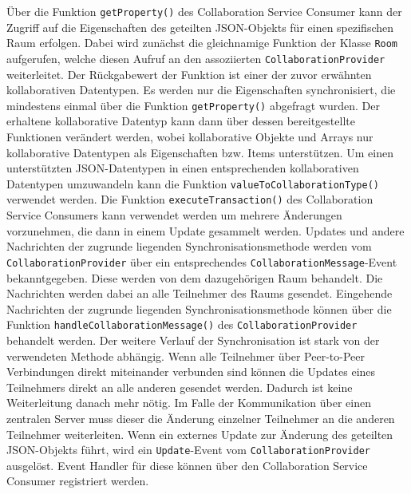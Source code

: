 Über die Funktion \texttt{getProperty()} des Collaboration Service Consumer kann der Zugriff auf die Eigenschaften des geteilten JSON-Objekts für einen spezifischen Raum erfolgen. Dabei wird zunächst die gleichnamige Funktion der Klasse \texttt{Room} aufgerufen, welche diesen Aufruf an den assoziierten \texttt{CollaborationProvider} weiterleitet. Der Rückgabewert der Funktion ist einer der zuvor erwähnten kollaborativen Datentypen. Es werden nur die Eigenschaften synchronisiert, die mindestens einmal über die Funktion \texttt{getProperty()} abgefragt wurden. Der erhaltene kollaborative Datentyp kann dann über dessen bereitgestellte Funktionen verändert werden, wobei kollaborative Objekte und Arrays nur kollaborative Datentypen als Eigenschaften bzw. Items unterstützen. Um einen unterstützten JSON-Datentypen in einen entsprechenden kollaborativen Datentypen umzuwandeln kann die Funktion \texttt{valueToCollaborationType()} verwendet werden. Die Funktion \texttt{executeTransaction()} des Collaboration Service Consumers kann verwendet werden um mehrere Änderungen vorzunehmen, die dann in einem Update gesammelt werden. Updates und andere Nachrichten der zugrunde liegenden Synchronisationsmethode werden vom \texttt{CollaborationProvider} über ein entsprechendes \texttt{CollaborationMessage}-Event bekanntgegeben. Diese werden von dem dazugehörigen Raum behandelt. Die Nachrichten werden dabei an alle Teilnehmer des Raums gesendet. Eingehende Nachrichten der zugrunde liegenden Synchronisationsmethode können über die Funktion \texttt{handleCollaborationMessage()} des \texttt{CollaborationProvider} behandelt werden. Der weitere Verlauf der Synchronisation ist stark von der verwendeten Methode abhängig. Wenn alle Teilnehmer über Peer-to-Peer Verbindungen direkt miteinander verbunden sind können die Updates eines Teilnehmers direkt an alle anderen gesendet werden. Dadurch ist keine Weiterleitung danach mehr nötig. Im Falle der Kommunikation über einen zentralen Server muss dieser die Änderung einzelner Teilnehmer an die anderen Teilnehmer weiterleiten. Wenn ein externes Update zur Änderung des geteilten JSON-Objekts führt, wird ein \texttt{Update}-Event vom \texttt{CollaborationProvider} ausgelöst. Event Handler für diese können über den Collaboration Service Consumer registriert werden.

